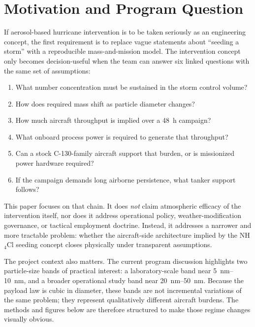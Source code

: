 \documentclass[8pt,twocolumn]{extarticle}
\begin{document}
\section*{Motivation and Program Question}

If aerosol-based hurricane intervention is to be taken seriously as an engineering concept, the first requirement is to replace vague statements about ``seeding a storm'' with a reproducible mass-and-mission model. The intervention concept only becomes decision-useful when the team can answer six linked questions with the same set of assumptions:
\begin{enumerate}[leftmargin=1.1em,itemsep=0.1em]
\item What number concentration must be sustained in the storm control volume?
\item How does required mass shift as particle diameter changes?
\item How much aircraft throughput is implied over a \SI{48}{h} campaign?
\item What onboard process power is required to generate that throughput?
\item Can a stock C-130-family aircraft support that burden, or is missionized power hardware required?
\item If the campaign demands long airborne persistence, what tanker support follows?
\end{enumerate}

\vspace{0.25em}
This paper focuses on that chain. It does \emph{not} claim atmospheric efficacy of the intervention itself, nor does it address operational policy, weather-modification governance, or tactical employment doctrine. Instead, it addresses a narrower and more tractable problem: whether the aircraft-side architecture implied by the NH$_4$Cl seeding concept closes physically under transparent assumptions.

\vspace{0.25em}
The project context also matters. The current program discussion highlights two particle-size bands of practical interest: a laboratory-scale band near \SIrange{5}{10}{nm}, and a broader operational study band near \SIrange{20}{50}{nm}. Because the payload law is cubic in diameter, these bands are not incremental variations of the same problem; they represent qualitatively different aircraft burdens. The methods and figures below are therefore structured to make those regime changes visually obvious.
\end{document}
